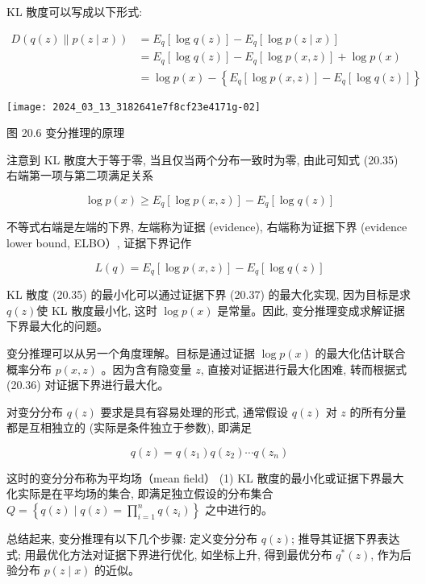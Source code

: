\documentclass[10pt]{article}
\begin{document}
\begin{CJK*}{UTF8}{bsmi}
KL 散度可以写成以下形式:


\begin{align*}
D(q(z) \| p(z \mid x)) & =E_{q}[\log q(z)]-E_{q}[\log p(z \mid x)] \\
& =E_{q}[\log q(z)]-E_{q}[\log p(x, z)]+\log p(x) \\
& =\log p(x)-\left\{E_{q}[\log p(x, z)]-E_{q}[\log q(z)]\right\} \tag{20.35}
\end{align*}


\begin{center}
\texttt{[image: 2024\_03\_13\_3182641e7f8cf23e4171g-02]}
\end{center}

图 20.6 变分推理的原理

注意到 KL 散度大于等于零, 当且仅当两个分布一致时为零, 由此可知式 (20.35) 右端第一项与第二项满足关系


\begin{equation*}
\log p(x) \geqslant E_{q}[\log p(x, z)]-E_{q}[\log q(z)] \tag{20.36}
\end{equation*}


不等式右端是左端的下界, 左端称为证据 (evidence), 右端称为证据下界 (evidence lower bound, ELBO）, 证据下界记作


\begin{equation*}
L(q)=E_{q}[\log p(x, z)]-E_{q}[\log q(z)] \tag{20.37}
\end{equation*}


KL 散度 (20.35) 的最小化可以通过证据下界 (20.37) 的最大化实现, 因为目标是求 $q(z)$使 KL 散度最小化, 这时 $\log p(x)$ 是常量。因此, 变分推理变成求解证据下界最大化的问题。

变分推理可以从另一个角度理解。目标是通过证据 $\log p(x)$ 的最大化估计联合概率分布 $p(x, z)$ 。因为含有隐变量 $z$, 直接对证据进行最大化困难, 转而根据式 (20.36) 对证据下界进行最大化。

对变分分布 $q(z)$ 要求是具有容易处理的形式, 通常假设 $q(z)$ 对 $z$ 的所有分量都是互相独立的 (实际是条件独立于参数), 即满足


\begin{equation*}
q(z)=q\left(z_{1}\right) q\left(z_{2}\right) \cdots q\left(z_{n}\right) \tag{20.38}
\end{equation*}


这时的变分分布称为平均场（mean field） (1) KL 散度的最小化或证据下界最大化实际是在平均场的集合, 即满足独立假设的分布集合 $Q=\left\{q(z) \mid q(z)=\prod_{i=1}^{n} q\left(z_{i}\right)\right\}$ 之中进行的。

总结起来, 变分推理有以下几个步骤: 定义变分分布 $q(z)$; 推导其证据下界表达式; 用最优化方法对证据下界进行优化, 如坐标上升, 得到最优分布 $q^{*}(z)$, 作为后验分布 $p(z \mid x)$ 的近似。


\end{CJK*}
\end{document}
